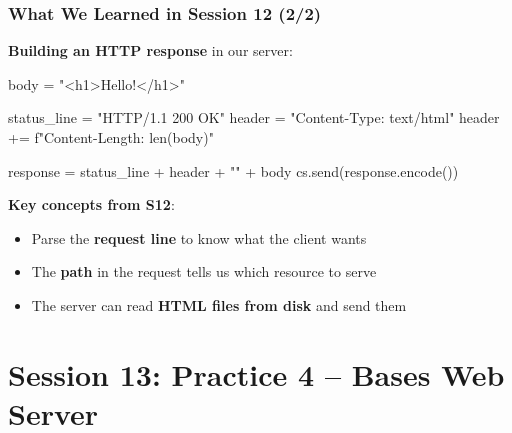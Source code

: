 \documentclass[xcolor=table]{beamer}
\begin{document}
\begin{frame}[fragile]
\frametitle{What We Learned in Session 12 (2/2)}

\textbf{Building an HTTP response} in our server:

\vspace{0.1cm}

\begin{python}
body = "<h1>Hello!</h1>"

status_line = "HTTP/1.1 200 OK\n"
header = "Content-Type: text/html\n"
header += f"Content-Length: {len(body)}\n"

response = status_line + header + "\n" + body
cs.send(response.encode())
\end{python}

\vspace{0.2cm}

\textbf{Key concepts from S12}:
\begin{itemize}
\item Parse the \textbf{request line} to know what the client wants
\item The \textbf{path} in the request tells us which resource to serve
\item The server can read \textbf{HTML files from disk} and send them
\end{itemize}

\end{frame}


\section{Session 13: Practice 4 -- Bases Web Server}
\end{document}
